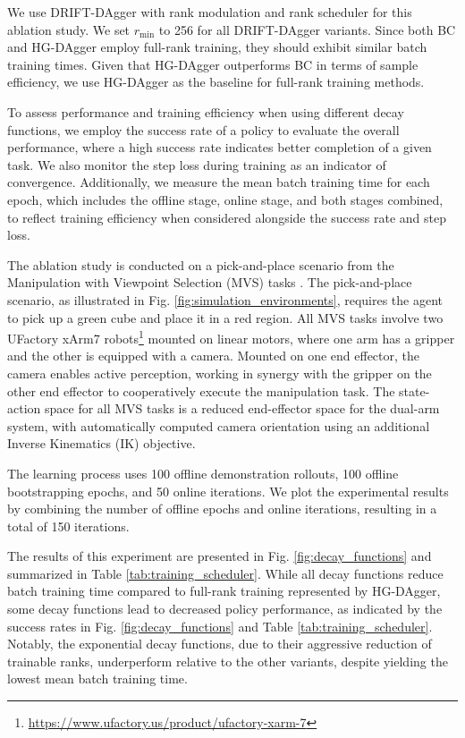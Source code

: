 
We use DRIFT-DAgger with rank modulation and rank scheduler for this ablation study. We set $r_{\text{min}}$ to 256 for all DRIFT-DAgger variants. Since both BC and HG-DAgger employ full-rank training, they should exhibit similar batch training times. Given that HG-DAgger outperforms BC in terms of sample efficiency\cite{kelly2019hg}, we use HG-DAgger as the baseline for full-rank training methods. 

To assess performance and training efficiency when using different decay functions, we employ the success rate of a policy to evaluate the overall performance, where a high success rate indicates better completion of a given task. We also monitor the step loss during training as an indicator of convergence. Additionally, we measure the mean batch training time for each epoch, which includes the offline stage, online stage, and both stages combined, to reflect training efficiency when considered alongside the success rate and step loss. 

The ablation study is conducted on a pick-and-place scenario from the Manipulation with Viewpoint Selection (MVS) tasks \cite{sun2024comparative}. The pick-and-place scenario, as illustrated in Fig. \ref{fig:simulation_environments}, requires the agent to pick up a green cube and place it in a red region.  All MVS tasks involve two UFactory xArm7 robots\footnote{\href{https://www.ufactory.us/product/ufactory-xarm-7}{https://www.ufactory.us/product/ufactory-xarm-7}} mounted on linear motors, where one arm has a gripper and the other is equipped with a camera. Mounted on one end effector, the camera enables active perception, working in synergy with the gripper on the other end effector to cooperatively execute the manipulation task. The state-action space for all MVS tasks is a reduced end-effector space for the dual-arm system, with automatically computed camera orientation using an additional Inverse Kinematics (IK) objective.

The learning process uses 100 offline demonstration rollouts, 100 offline bootstrapping epochs, and 50 online iterations. We plot the experimental results by combining the number of offline epochs and online iterations, resulting in a total of 150 iterations.

The results of this experiment are presented in Fig. \ref{fig:decay_functions} and summarized in Table \ref{tab:training_scheduler}. While all decay functions reduce batch training time compared to full-rank training represented by HG-DAgger, some decay functions lead to decreased policy performance, as indicated by the success rates in Fig. \ref{fig:decay_functions} and Table \ref{tab:training_scheduler}. Notably, the exponential decay functions, due to their aggressive reduction of trainable ranks, underperform relative to the other variants, despite yielding the lowest mean batch training time.

